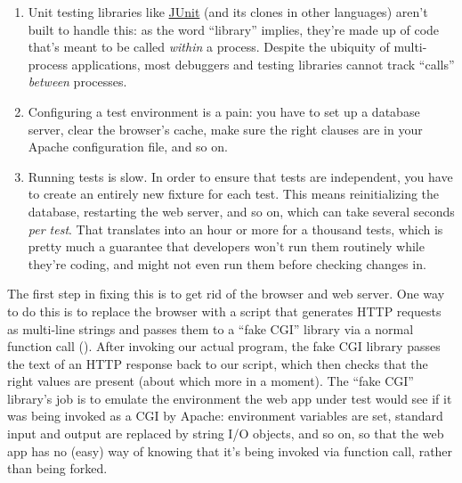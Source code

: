 \documentclass{report}
\begin{document}
\begin{enumerate}

  \item Unit testing libraries like \url{JUnit} (and its clones in
  other languages) aren't built to handle this: as the word
  ``library'' implies, they're made up of code that's meant to be
  called \emph{within} a process.  Despite the ubiquity of
  multi-process applications, most debuggers and testing libraries
  cannot track ``calls'' \emph{between} processes.

  \item Configuring a test environment is a pain: you have to set up a
  database server, clear the browser's cache, make sure the right
  clauses are in your Apache configuration file, and so on.

  \item Running tests is slow. In order to ensure that tests are
  independent, you have to create an entirely new fixture for each
  test.  This means reinitializing the database, restarting the web
  server, and so on, which can take several seconds \emph{per
  test}. That translates into an hour or more for a thousand tests,
  which is pretty much a guarantee that developers won't run them
  routinely while they're coding, and might not even run them before
  checking changes in.

\end{enumerate}

The first step in fixing this is to get rid of the browser and web
server. One way to do this is to replace the browser with a script
that generates HTTP requests as multi-line strings and passes them to
a ``fake CGI'' library via a normal function call
().  After invoking our actual program, the
fake CGI library passes the text of an HTTP response back to our
script, which then checks that the right values are present (about
which more in a moment). The ``fake CGI'' library's job is to emulate
the environment the web app under test would see if it was being
invoked as a CGI by Apache: environment variables are set, standard
input and output are replaced by string I/O objects, and so on, so
that the web app has no (easy) way of knowing that it's being invoked
via function call, rather than being forked.

\begin{figure}
\end{figure}
\end{document}
